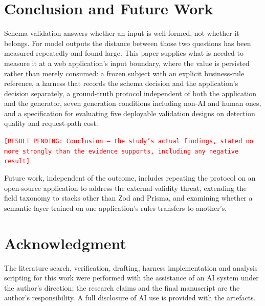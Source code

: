 \documentclass[conference]{IEEEtran}
\newcommand{\pending}[1]{\textcolor{red}{\texttt{[RESULT PENDING: #1]}}}
\begin{document}
\section{Conclusion and Future Work}
\label{sec:conclusion}

Schema validation answers whether an input is well formed, not whether it belongs. For model outputs
the distance between those two questions has been measured repeatedly and found large. This paper
supplies what is needed to measure it at a web application's input boundary, where the value is
persisted rather than merely consumed: a frozen subject with an explicit business-rule reference, a
harness that records the schema decision and the application's decision separately, a ground-truth
protocol independent of both the application and the generator, seven generation conditions including
non-AI and human ones, and a specification for evaluating five deployable validation designs on
detection quality and request-path cost.

\pending{Conclusion --- the study's actual findings, stated no more strongly than the evidence
supports, including any negative result}

Future work, independent of the outcome, includes repeating the protocol on an open-source
application to address the external-validity threat, extending the field taxonomy to stacks other
than Zod and Prisma, and examining whether a semantic layer trained on one application's rules
transfers to another's.

\section*{Acknowledgment}

The literature search, verification, drafting, harness implementation and analysis scripting for this
work were performed with the assistance of an AI system under the author's direction; the research
claims and the final manuscript are the author's responsibility. A full disclosure of AI use is
provided with the artefacts.



\end{document}
